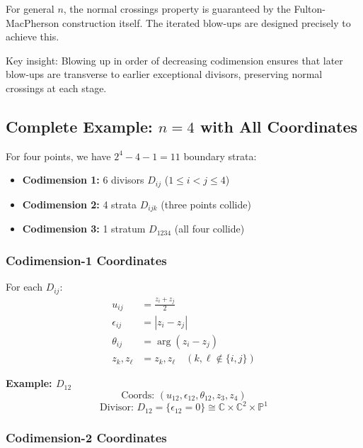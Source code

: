 \begin{remark}
For general $n$, the normal crossings property is guaranteed by the Fulton-MacPherson
construction itself. The iterated blow-ups are designed precisely to achieve this.

Key insight: Blowing up in order of decreasing codimension ensures that later blow-ups
are transverse to earlier exceptional divisors, preserving normal crossings at each stage.
\end{remark}

\subsection{Complete Example: $n=4$ with All Coordinates}

\begin{example}\label{ex:coords-n4-complete}
For four points, we have $2^4 - 4 - 1 = 11$ boundary strata:
\begin{itemize}
\item \textbf{Codimension 1:} 6 divisors $D_{ij}$ ($1 \leq i < j \leq 4$)
\item \textbf{Codimension 2:} 4 strata $D_{ijk}$ (three points collide)
\item \textbf{Codimension 3:} 1 stratum $D_{1234}$ (all four collide)
\end{itemize}

\subsubsection{Codimension-1 Coordinates}

For each $D_{ij}$:
\begin{align}
u_{ij} &= \frac{z_i + z_j}{2}\\
\epsilon_{ij} &= |z_i - z_j|\\
\theta_{ij} &= \arg(z_i - z_j)\\
z_k, z_\ell &= z_k, z_\ell \quad (k, \ell \notin \{i,j\})
\end{align}

\textbf{Example: $D_{12}$}
$$\text{Coords: } (u_{12}, \epsilon_{12}, \theta_{12}, z_3, z_4)$$
$$\text{Divisor: } D_{12} = \{\epsilon_{12} = 0\} \cong \mathbb{C} \times \mathbb{C}^2 
\times \mathbb{P}^1$$

\subsubsection{Codimension-2 Coordinates}


\end{example}
